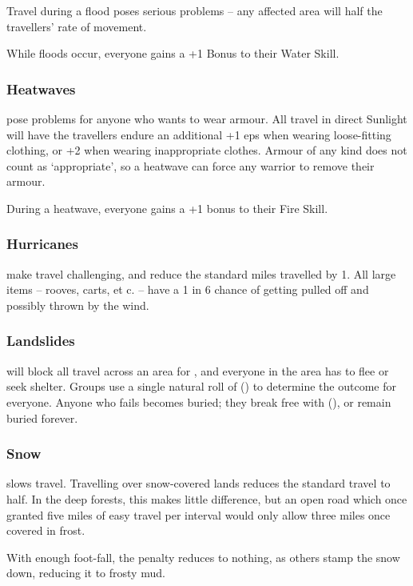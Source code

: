 \begin{multicols}{2}
Travel during a flood poses serious problems -- any affected area will half the travellers' rate of movement.

While floods occur, everyone gains a +1 Bonus to their Water Skill.

\subsubsection{Heatwaves}
pose problems for anyone who wants to wear armour.
All travel in direct Sunlight will have the travellers endure an additional +1 \glspl{ep} when wearing loose-fitting clothing, or +2 when wearing inappropriate clothes.
Armour of any kind does not count as `appropriate', so a heatwave can force any warrior to remove their armour.

During a heatwave, everyone gains a +1 bonus to their Fire Skill.

\subsubsection{Hurricanes}
make travel challenging, and reduce the standard miles travelled by 1.
All large items -- rooves, carts, et c. -- have a 1 in 6 chance of getting pulled off and possibly thrown by the wind.

\subsubsection{Landslides}
will block all travel across an area for , and everyone in the area has to flee or seek shelter.
Groups use a single \gls{natural} roll of  (\tn[10]) to determine the outcome for everyone.
Anyone who fails becomes buried; they break free with  (\tn[10]), or remain buried forever.

\subsubsection{Snow}
slows travel.
Travelling over snow-covered lands reduces the standard travel to half.
In the deep forests, this makes little difference, but an open road which once granted five miles of easy travel per \gls{interval} would only allow three miles once covered in frost.

With enough foot-fall, the penalty reduces to nothing, as others stamp the snow down, reducing it to frosty mud.


\end{multicols}
